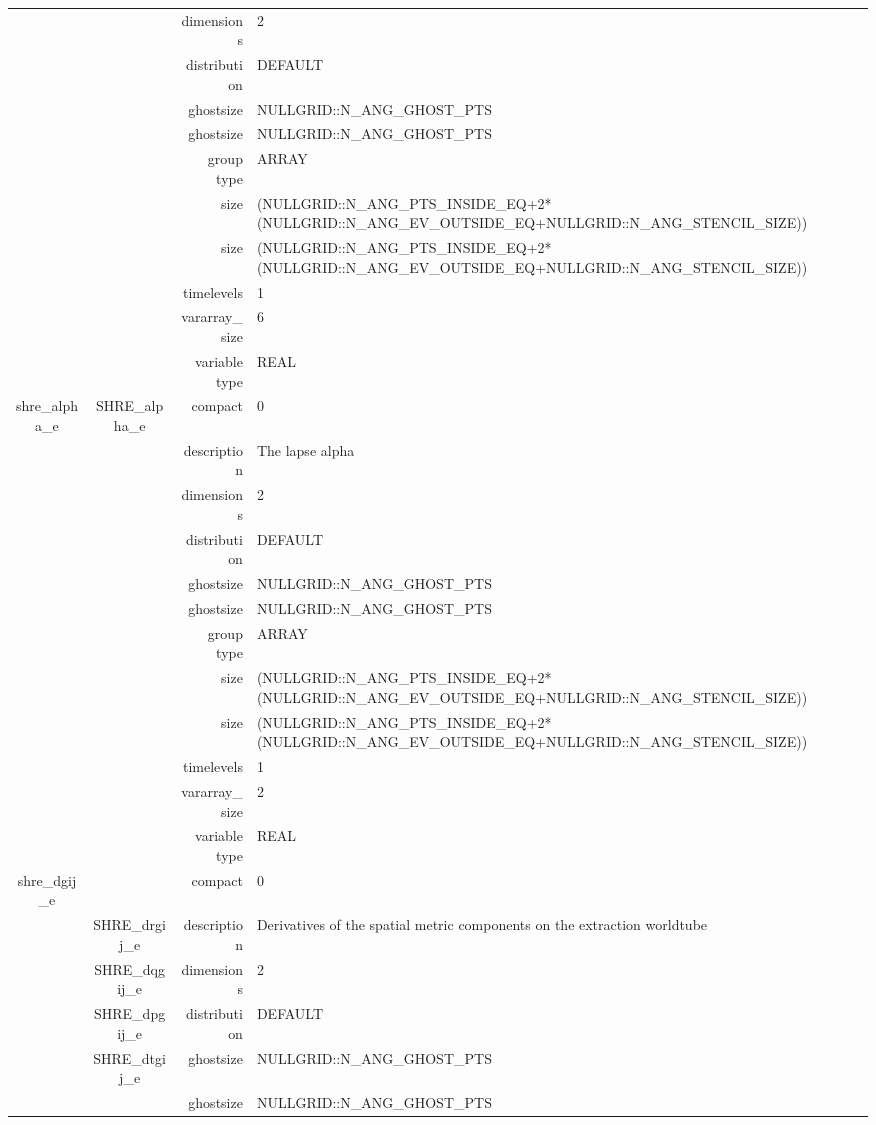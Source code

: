 \begin{tabular*}{150mm}{|c|c@{\extracolsep{\fill}}|rl|}
 &  & dimensions & 2 \\ 
 &  & distribution & DEFAULT \\ 
 &  & ghostsize & NULLGRID::N\_ANG\_GHOST\_PTS \\ 
& ~ & ghostsize & NULLGRID::N\_ANG\_GHOST\_PTS \\ 
 &  & group type & ARRAY \\ 
 &  & size & (NULLGRID::N\_ANG\_PTS\_INSIDE\_EQ+2*(NULLGRID::N\_ANG\_EV\_OUTSIDE\_EQ+NULLGRID::N\_ANG\_STENCIL\_SIZE)) \\ 
& ~ & size & (NULLGRID::N\_ANG\_PTS\_INSIDE\_EQ+2*(NULLGRID::N\_ANG\_EV\_OUTSIDE\_EQ+NULLGRID::N\_ANG\_STENCIL\_SIZE)) \\ 
 &  & timelevels & 1 \\ 
 &  & vararray\_size & 6 \\ 
 &  & variable type & REAL \\ 
\hline 
shre\_alpha\_e & SHRE\_alpha\_e & compact & 0 \\ 
 &  & description & The lapse alpha \\ 
 &  & dimensions & 2 \\ 
 &  & distribution & DEFAULT \\ 
 &  & ghostsize & NULLGRID::N\_ANG\_GHOST\_PTS \\ 
& ~ & ghostsize & NULLGRID::N\_ANG\_GHOST\_PTS \\ 
 &  & group type & ARRAY \\ 
 &  & size & (NULLGRID::N\_ANG\_PTS\_INSIDE\_EQ+2*(NULLGRID::N\_ANG\_EV\_OUTSIDE\_EQ+NULLGRID::N\_ANG\_STENCIL\_SIZE)) \\ 
& ~ & size & (NULLGRID::N\_ANG\_PTS\_INSIDE\_EQ+2*(NULLGRID::N\_ANG\_EV\_OUTSIDE\_EQ+NULLGRID::N\_ANG\_STENCIL\_SIZE)) \\ 
 &  & timelevels & 1 \\ 
 &  & vararray\_size & 2 \\ 
 &  & variable type & REAL \\ 
\hline 
shre\_dgij\_e &  & compact & 0 \\ 
 & SHRE\_drgij\_e & description & Derivatives of the spatial metric components on the extraction worldtube \\ 
 & SHRE\_dqgij\_e & dimensions & 2 \\ 
 & SHRE\_dpgij\_e & distribution & DEFAULT \\ 
 & SHRE\_dtgij\_e & ghostsize & NULLGRID::N\_ANG\_GHOST\_PTS \\ 
& ~ & ghostsize & NULLGRID::N\_ANG\_GHOST\_PTS \\ 

\end{tabular*}
